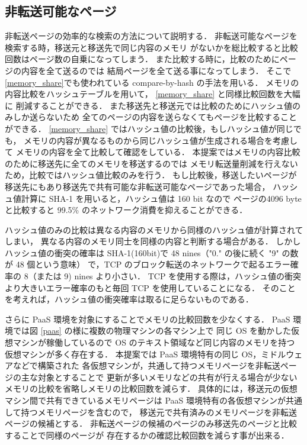 \documentclass[graduation-thesis]{mlarticle}
\begin{document}
\subsection{非転送可能なページ}
\label{sec-4-3}
\label{non_migration_pages}
非転送ページの効率的な検索の方法について説明する．
非転送可能なページを検索する時，移送元と移送先で同じ内容のメモリ
がないかを総比較すると比較回数はページ数の自乗になってしまう．
また比較する時に，比較のためにページの内容を全て送るのでは
結局ページを全て送る事になってしまう．
そこで\ref{memory_share}でも使われている compare-by-hash \cite{Val:2003:AAC}
の手法を用いる．
メモリの内容比較をハッシュテーブルを用いて， \ref{memory_share} と同様比較回数を大幅に
削減することができる．
また移送先と移送元では比較のためにハッシュ値のみしか送らないため
全てのページの内容を送らなくてもページを比較することができる．
\ref{memory_share} ではハッシュ値の比較後，もしハッシュ値が同じでも，
メモリの内容が異なるものから同じハッシュ値が生成される場合を考慮して
メモリの内容を全て比較して確認をしている．
本提案ではメモリの内容比較のために移送先に全てのメモリを移送するのでは
メモリ転送量削減を行えないため，比較ではハッシュ値比較のみを行う．
もし比較後，移送したいページが移送先にもあり移送先で共有可能な非転送可能なページであった場合，
ハッシュ値計算に SHA-1 を用いると，ハッシュ値は 160 bit なので
ページの4096 byte と比較すると 99.5\% のネットワーク消費を抑えることができる．

ハッシュ値のみの比較は異なる内容のメモリから同様のハッシュ値が計算されてしまい，
異なる内容のメモリ同士を同様の内容と判断する場合がある．
しかしハッシュ値の衝突の確率は SHA-1(160bit)で 48 nines（"0." の後に続く "9" の数が 48 個という意味）
で，TCP のブロック転送のネットワークで起るエラー確率の 8（または 9) nines より小さい．
TCP を使用する際は，ハッシュ値の衝突より大きいエラー確率のもと毎回
TCP を使用していることになる\cite{Val:2005:GUC}．
そのことを考えれば，ハッシュ値の衝突確率は取るに足らないものである．

さらに PaaS 環境を対象にすることでメモリの比較回数を少なくする．
PaaS 環境では図 \ref{paas} の様に複数の物理マシンの各マシン上で
同じ OS を動かした仮想マシンが稼働しているので OS のテキスト領域など同じ内容のメモリを持つ
仮想マシンが多く存在する．
本提案では PaaS 環境特有の同じ OS，ミドルウェアなどで構築された
各仮想マシンが，共通して持つメモリページを非転送ページの主な対象とすることで
更新が多いメモリなどの共有が行える場合が少ないメモリの比較を省略しメモリの比較回数を減らす．
具体的には，移送元の仮想マシン間で共有できているメモリページは
PaaS 環境特有の各仮想マシンが共通して持つメモリページを含むので，
移送元で共有済みのメモリページを非転送ページの候補とする．
非転送ページの候補のページのみ移送先のページと比較することで同様のページが
存在するかの確認比較回数を減らす事が出来る．
\end{document}
